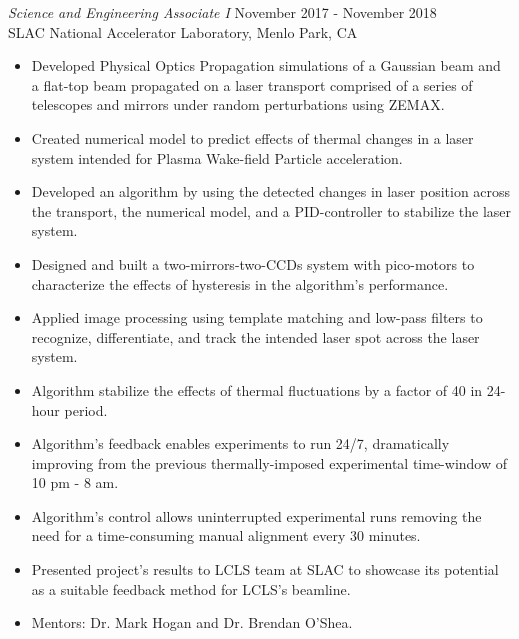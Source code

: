 \documentclass[margin,line]{res}
\begin{document}
\begin{resume}
{\sl Science and Engineering Associate I} \hfill November 2017 - November 2018 \\
				SLAC National Accelerator Laboratory, Menlo Park, CA
				\begin{itemize}
					\itemsep -2pt
					\item Developed Physical Optics Propagation simulations of a Gaussian beam and a flat-top beam propagated on a laser transport comprised of a series of telescopes and mirrors under random perturbations using ZEMAX. 
					\item Created numerical model to predict effects of thermal changes in a laser system intended for Plasma Wake-field Particle acceleration.  
					\item Developed an algorithm by using the detected changes in laser position across the transport, the numerical model, and a PID-controller to stabilize the laser system. 
					\item Designed and built a two-mirrors-two-CCDs system with pico-motors to characterize the effects of hysteresis in the algorithm's performance.
					\item Applied image processing using template matching and low-pass filters to recognize, differentiate, and track the intended laser spot across the laser system. 
					\item Algorithm stabilize the effects of thermal fluctuations by a factor of 40 in 24-hour period. 
					\item Algorithm's feedback enables experiments to run 24/7, dramatically improving from the previous thermally-imposed experimental time-window of 10 pm - 8 am.
					\item Algorithm's control allows uninterrupted experimental runs removing the need for a time-consuming manual alignment every 30 minutes. 
					\item Presented project's results to LCLS team at SLAC to showcase its potential as a suitable feedback method for LCLS's beamline.
					\item Mentors: Dr. Mark Hogan and Dr. Brendan O'Shea.
				\end{itemize}
				

\end{resume}
\end{document}
